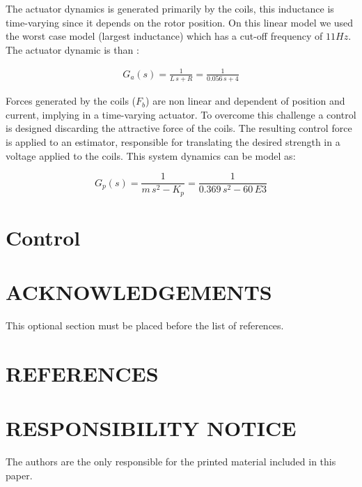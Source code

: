 \documentclass[10pt,fleqn,a4paper,twoside]{article}
\begin{document}
	
	The actuator dynamics is generated primarily by the coils,  this inductance is time-varying since it depends on the rotor position. On this linear model we used the worst case model (largest inductance) which has a cut-off frequency of $11Hz$. The actuator dynamic is than :
	
	\begin{align}
		G_a(s) = \frac{1}{L \, s + R} =  \frac{1}{0.056 \, s + 4}
	\end{align}
	
	Forces generated by the coils ($F_b$) are non linear and dependent of position and current, implying in a time-varying actuator. To overcome this challenge a control is designed discarding the attractive force of the coils. The resulting control force is applied to an estimator, responsible for translating the desired strength in a voltage applied to the coils. This system dynamics can be model as:
	
	\begin{equation}
		G_p(s) = \frac{1}{m \, s^2 - K_p} = \frac{1}{0.369 \, s^2 - 60 \,E3}
	\end{equation}


%
	
	\section{Control}
	
	\section{ACKNOWLEDGEMENTS}
	
	This optional section must be placed before the list of references.
	
	\section{REFERENCES} 
	
	
	\renewcommand{\refname}{}
	
	
	\section{RESPONSIBILITY NOTICE}
	
	The authors are the only responsible for the printed material included in this paper.
	
\end{document}
